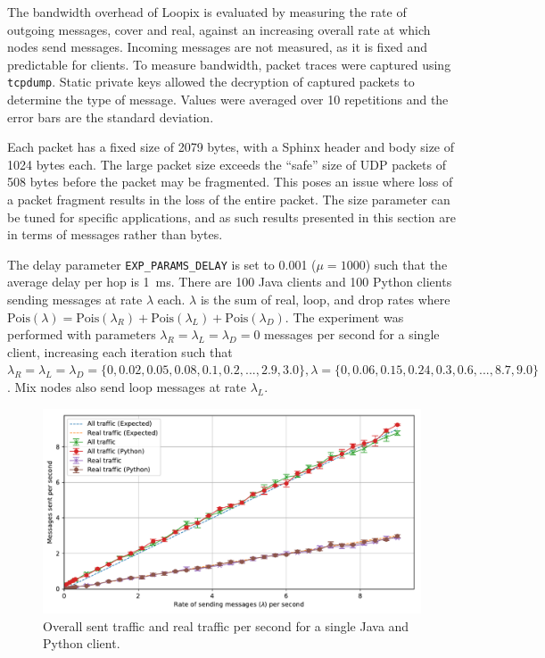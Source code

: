 \documentclass[final,dissertation.tex]{subfiles}
\begin{document}
The bandwidth overhead of Loopix is evaluated by measuring the rate of outgoing messages, cover and real, against an increasing overall rate at which nodes send messages. Incoming messages are not measured, as it is fixed and predictable for clients. To measure bandwidth, packet traces were captured using \verb|tcpdump|. Static private keys allowed the decryption of captured packets to determine the type of message. Values were averaged over 10 repetitions and the error bars are the standard deviation.

Each packet has a fixed size of 2079 bytes, with a Sphinx header and body size of 1024 bytes each. The large packet size exceeds the ``safe'' size of UDP packets of 508 bytes before the packet may be fragmented. This poses an issue where loss of a packet fragment results in the loss of the entire packet. The size parameter can be tuned for specific applications, and as such results presented in this section are in terms of messages rather than bytes.

The delay parameter \verb|EXP_PARAMS_DELAY| is set to 0.001 ($\mu = 1000$) such that the average delay per hop is \SI{1}{\milli\second}. There are 100 Java clients and 100 Python clients sending messages at rate $\lambda$ each. $\lambda$ is the sum of real, loop, and drop rates where $\text{Pois}(\lambda) = \text{Pois}(\lambda_R) + \text{Pois}(\lambda_L) + \text{Pois}(\lambda_D)$. The experiment was performed with parameters $\lambda_R = \lambda_L = \lambda_D = 0$ messages per second for a single client, increasing each iteration such that $\lambda_R = \lambda_L = \lambda_D = \{0, 0.02, 0.05, 0.08, 0.1, 0.2, ..., 2.9, 3.0\}, \lambda = \{0, 0.06, 0.15, 0.24, 0.3, 0.6, ..., 8.7, 9.0\}$. Mix nodes also send loop messages at rate $\lambda_L$.

\begin{figure}[h]
	\includegraphics[width=\linewidth]{../figs/client_bandwidth_2}
	\caption{Overall sent traffic and real traffic per second for a single Java and Python client.}
	\label{fig:client_bandwidth_2}
\end{figure}
\end{document}

